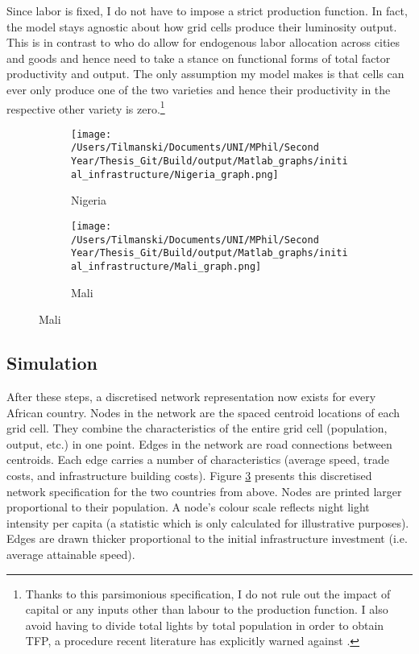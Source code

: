 \documentclass[11pt, oneside]{article}   	%
\begin{document}
Since labor is fixed, I do not have to impose a strict production function. In fact, the model stays agnostic about how grid cells produce their luminosity output. This is in contrast to \citeauthor{fajgelbaum_optimal_2017} who do allow for endogenous labor allocation across cities and goods and hence need to take a stance on functional forms of total factor productivity and output. The only assumption my model makes is that cells can ever only produce one of the two varieties and hence their productivity in the respective other variety is zero.\footnote{Thanks to this parsimonious specification, I do not rule out the impact of capital or any inputs other than labour to the production function. I also avoid having to divide total lights by total population in order to obtain TFP, a procedure recent literature has explicitly warned against \citep[see e.g.][]{michalopoulos_spatial_2018}.}

\begin{figure}[t]
\centering
\caption{Discretised Networks for different countries}

\begin{subfigure}[c]{0.48\textwidth}
\texttt{[image: /Users/Tilmanski/Documents/UNI/MPhil/Second Year/Thesis\_Git/Build/output/Matlab\_graphs/initial\_infrastructure/Nigeria\_graph.png]}
\caption{Nigeria}
\label{fig:nigeria_mat}
\end{subfigure}
\begin{subfigure}[c]{0.48\textwidth}
\texttt{[image: /Users/Tilmanski/Documents/UNI/MPhil/Second Year/Thesis\_Git/Build/output/Matlab\_graphs/initial\_infrastructure/Mali\_graph.png]}
\caption{Mali}
\label{fig:Mali_mat}
\end{subfigure}
\label{fig:matlab_networks}
\end{figure}

\subsection{Simulation}

After these steps, a discretised network representation now exists for every African country. Nodes in the network are the spaced centroid locations of each grid cell. They combine the characteristics of the entire grid cell (population, output, etc.) in one point. Edges in the network are road connections between centroids. Each edge carries a number of characteristics (average speed, trade costs, and infrastructure building costs). Figure \ref{fig:matlab_networks} presents this discretised network specification for the two countries from above. Nodes are printed larger proportional to their population. A node's colour scale reflects night light intensity per capita (a statistic which is only calculated for illustrative purposes). Edges are drawn thicker proportional to the initial infrastructure investment (i.e. average attainable speed).
\end{document}
